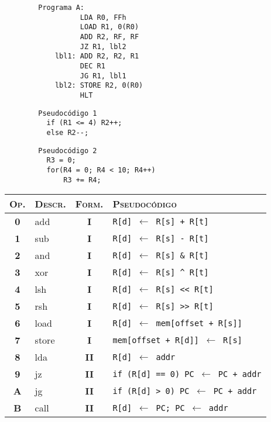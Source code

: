 \documentclass[12pt,a4paper]{article}
\begin{document}
\begin{small}
	\begin{minipage}{.4\textwidth}
		\begin{verbatim}
		Programa A:
			      LDA R0, FFh
			      LOAD R1, 0(R0)
			      ADD R2, RF, RF
			      JZ R1, lbl2
			lbl1: ADD R2, R2, R1
			      DEC R1
			      JG R1, lbl1
			lbl2: STORE R2, 0(R0)
			      HLT
		\end{verbatim}
		\begin{verbatim}
		Pseudocódigo 1
		  if (R1 <= 4) R2++;
		  else R2--;
		\end{verbatim}
		\begin{verbatim}
		Pseudocódigo 2
		  R3 = 0;
		  for(R4 = 0; R4 < 10; R4++)
		      R3 += R4;
		\end{verbatim}
	\end{minipage}
	\begin{minipage}{.6\textwidth}	
		\begin{tabular}{|c|l|c|l|}\hline
			\textsc{Op.} & \textsc{Descr.} & \textsc{Form.} & \textsc{Pseudocódigo} \\ \hline
			\textbf{0} & \textsf{add} & \textbf{I} & \texttt{R[d] $\leftarrow$ R[s] + R[t]} \\
			\textbf{1} & \textsf{sub} & \textbf{I} & \texttt{R[d] $\leftarrow$ R[s] - R[t]} \\
			\textbf{2} & \textsf{and} & \textbf{I} & \texttt{R[d] $\leftarrow$ R[s] \& R[t]} \\
			\textbf{3} & \textsf{xor} & \textbf{I} & \texttt{R[d] $\leftarrow$ R[s] \^{} R[t]} \\
			\textbf{4} & \textsf{lsh} & \textbf{I} & \texttt{R[d] $\leftarrow$ R[s] <{}<{} R[t]} \\
			\textbf{5} & \textsf{rsh}  & \textbf{I} & \texttt{R[d] $\leftarrow$ R[s] >{}>{} R[t]} \\
			\textbf{6} & \textsf{load}  & \textbf{I} & \texttt{R[d] $\leftarrow$ mem[offset + R[s]]} \\
			\textbf{7} & \textsf{store} & \textbf{I} & \texttt{mem[offset + R[d]] $\leftarrow$ R[s]} \\
			\textbf{8} & \textsf{lda}   & \textbf{II} & \texttt{R[d] $\leftarrow$ addr} \\
			\textbf{9} & \textsf{jz}    & \textbf{II} & \texttt{if (R[d] == 0) PC $\leftarrow$ PC + addr} \\
			\textbf{A} & \textsf{jg}    & \textbf{II} & \texttt{if (R[d] >{} 0) PC $\leftarrow$ PC + addr} \\
			\textbf{B} & \textsf{call}  & \textbf{II} & \texttt{R[d] $\leftarrow$ PC; PC $\leftarrow$ addr} \\

\end{tabular}
\end{minipage}
\end{small}
\end{document}
